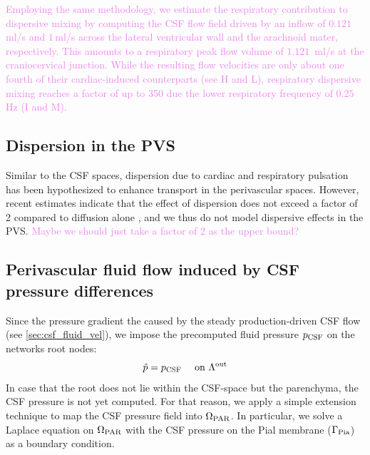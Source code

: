 \documentclass[fleqn,10pt]{wlscirep}
\newcommand{\mar}[1]{\textcolor{violet}{#1}}
\begin{document}
\mar{Employing the same methodology, we estimate the respiratory contribution to dispersive mixing by computing the CSF flow field driven by an inflow of $0.121\,$ml/s \cite{liu2024using} and $1\,$ml/s \cite{gutierrez2022effect} across the lateral ventricular wall and the arachnoid mater, respectively. This amounts to a respiratory peak flow volume of $1.121\,$ ml/s at the craniocervical junction. While the resulting flow velocities are only about one fourth of their cardiac-induced counterparts (see \Cref{fig:csf}H and L), respiratory dispersive mixing reaches a factor of up to 350 due the lower respiratory frequency of $0.25\,$Hz (\Cref{fig:csf}I and M).}


\subsection*{Dispersion in the PVS}

Similar to the CSF spaces, dispersion due to cardiac and respiratory pulsation has been hypothesized to enhance transport in the perivascular spaces. However, recent estimates indicate that the effect of dispersion does not exceed a factor of 2 compared to diffusion alone \cite{asgari2016glymphatic,keith2019dispersion,bojarskaite2023sleep,asgari2016glymphatic,troyetsky2021dispersion}, and we thus do not model dispersive effects in the PVS. 
\mar{Maybe we should just take a factor of 2 as the upper bound?}



\subsection*{Perivascular fluid flow induced by CSF pressure differences}

Since the pressure gradient the caused by the steady production-driven CSF flow (see \cref{sec:csf_fluid_vel}), we impose the precomputed fluid pressure $p_{\rm CSF}$ on the networks root nodes:
\begin{equation}
    \hat{p} = p_{\rm CSF} \quad \text{ on } \Lambda^{\rm out}
\end{equation}
In case that the root does not lie within the CSF-space but the parenchyma, the CSF pressure is not yet computed. For that reason, we apply a simple extension technique to map the CSF pressure field into $\Omega_{\rm PAR}$. In particular, we solve a Laplace equation on $\Omega_{\rm PAR}$ with the CSF pressure on the Pial membrane ($\Gamma_{\rm Pia}$) as a boundary condition.
\end{document}
